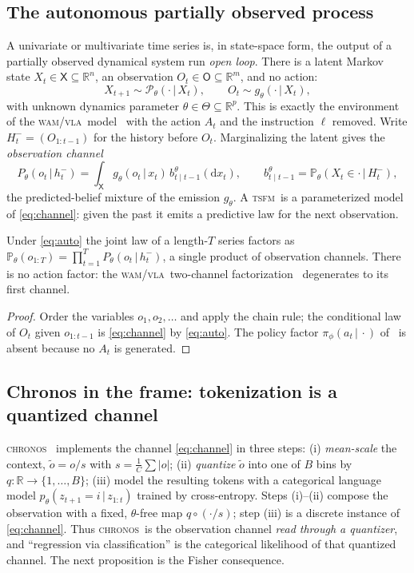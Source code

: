 \documentclass[10pt]{article}
\theoremstyle{plain}
\theoremstyle{definition}
\theoremstyle{remark}
\newcommand{\R}{\mathbb{R}}
\newcommand{\Prob}{\mathbb{P}}
\newcommand{\Os}{\mathsf{O}}
\newcommand{\Xs}{\mathsf{X}}
\newcommand{\given}{\,\vert\,}
\newcommand{\wm}{P_{\theta}}
\newcommand{\TSFM}{\textsc{tsfm}}
\newcommand{\WAM}{\textsc{wam}}
\newcommand{\VLA}{\textsc{vla}}
\newcommand{\Chronos}{\textsc{chronos}}
\begin{document}
\subsection{The autonomous partially observed process}
A univariate or multivariate time series is, in state-space form, the output of
a partially observed dynamical system run \emph{open loop}. There is a latent
Markov state $X_t\in\Xs\subseteq\R^n$, an observation $O_t\in\Os\subseteq\R^m$,
and no action:
\begin{equation}
 X_{t+1}\sim\mathcal P_\theta(\cdot\given X_t),\qquad
 O_t\sim g_\theta(\cdot\given X_t),
 \label{eq:auto}
\end{equation}
with unknown dynamics parameter $\theta\in\Theta\subseteq\R^p$. This is exactly
the environment of the \WAM/\VLA\ model~\cite[\S2]{wamvla} with the action $A_t$
and the instruction $\ell$ removed. Write $H_t^-=(O_{1:t-1})$ for the history
before $O_t$. Marginalizing the latent gives the \emph{observation channel}
\begin{equation}
 \wm(o_t\given h_t^-)=\int_\Xs g_\theta(o_t\given x_t)\,
   b_{t\mid t-1}^\theta(\mathrm dx_t),\qquad
 b_{t\mid t-1}^\theta=\Prob_\theta(X_t\in\cdot\given H_t^-),
 \label{eq:channel}
\end{equation}
the predicted-belief mixture of the emission $g_\theta$. A \TSFM\ is a
parameterized model of \eqref{eq:channel}: given the past it emits a predictive
law for the next observation.

\begin{proposition}\label{prop:factor}
Under \eqref{eq:auto} the joint law of a length-$T$ series factors as
$\Prob_\theta(o_{1:T})=\prod_{t=1}^T \wm(o_t\given h_t^-)$, a single product of
observation channels. There is no action factor: the \WAM/\VLA\ two-channel
factorization~\cite[Prop.~2.1]{wamvla} degenerates to its first channel.
\end{proposition}
\begin{proof}
Order the variables $o_1,o_2,\dots$ and apply the chain rule; the conditional law
of $O_t$ given $o_{1:t-1}$ is \eqref{eq:channel} by \eqref{eq:auto}. The policy
factor $\pi_\phi(a_t\given\cdot)$ of~\cite{wamvla} is absent because no $A_t$ is
generated.
\end{proof}

\subsection{Chronos in the frame: tokenization is a quantized channel}
\Chronos~\cite{chronos} implements the channel \eqref{eq:channel} in three
steps: (i) \emph{mean-scale} the context, $\tilde o=o/s$ with
$s=\tfrac1C\sum|o|$; (ii) \emph{quantize} $\tilde o$ into one of $B$ bins by
$q:\R\to\{1,\dots,B\}$; (iii) model the resulting tokens with a categorical
language model $p_\theta(z_{t+1}=i\given z_{1:t})$ trained by cross-entropy.
Steps (i)--(ii) compose the observation with a fixed, $\theta$-free map $q\circ
(\cdot/s)$; step (iii) is a discrete instance of \eqref{eq:channel}. Thus
\Chronos\ is the observation channel \emph{read through a quantizer}, and
``regression via classification'' is the categorical likelihood of that
quantized channel. The next proposition is the Fisher consequence.
\end{document}
